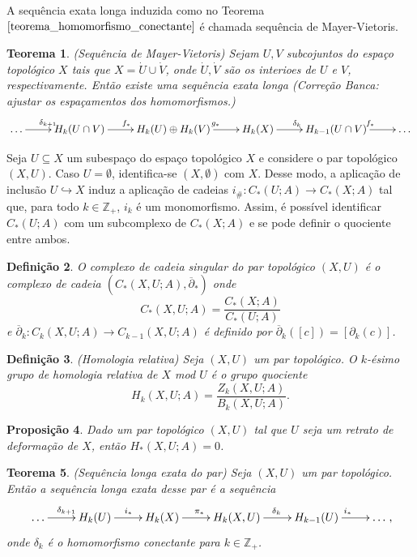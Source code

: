 \documentclass[12pt]{book}
\newtheorem{teorema}{Teorema}[section]
\newtheorem{definicao}[teorema]{Definição}
\newtheorem{proposicao}[teorema]{Proposição}
\newcommand{\bordo}[1]{\partial_{#1}}
\newcommand{\bordorel}[1]{\overline{\partial}_{#1}}
\newcommand{\cadeia}[2]{C_{#1}(#2; A)}
\newcommand{\classe}[1]{[#1]}
\newcommand{\homologia}[2]{H_{#1}(#2;A)}
\newcommand{\homologiaabrev}[2]{H_{#1}(#2)}
\newcommand{\imagembordo}[2]{B_{#1}(#2;A)}
\newcommand{\induzida}[1]{#1_{\#}}
\newcommand{\inteiros}{\mathbb{Z}}
\newcommand{\inteirospos}{\inteiros_{+}}
\newcommand{\kernelbordo}[2]{Z_{#1}(#2;A)}
\newcommand{\alerta}[1]{{\color{red}#1}}
\newcommand{\correcaobanca}[1]{\alerta{(Correção Banca: #1)}}
\begin{document}
	A sequência exata longa induzida como no Teorema $\ref{teorema_homomorfismo_conectante}$ é chamada sequência de Mayer-Vietoris.
	
	\begin{teorema}
		(Sequência de Mayer-Vietoris) Sejam $U, V$ subcojuntos do espaço topológico $X$ tais que $X = \dot{U }\cup \dot{V}$, onde $\dot{U}, \dot{V}$ são os interioes de $U$ e $V$, respectivamente. Então existe uma sequência exata longa 
			\correcaobanca{ajustar os espaçamentos dos homomorfismos.}
		\[
		\xymatrix{\dots \ar[r]^{\delta_{k+1}} & \homologiaabrev{k}{U\cap V}\ar[r]^{f_{*}} & \homologiaabrev{k}{U}\oplus \homologiaabrev{k}{V}\ar[r]^{g_{*}}& \homologiaabrev{k}{X}\ar[r]^{\delta_{k}} & \homologiaabrev{k-1}{U \cap V} \ar[r]^{f_{*}}& \dots} 
		\]
		
	\end{teorema}
	
	Seja $U \subseteq X$ um subespaço do espaço topológico $X$ e considere o par topológico $(X, U)$. Caso $U = \emptyset$, identifica-se $(X, \emptyset)$ com $X$. Desse modo, a aplicação de inclusão $U \hookrightarrow X$ induz a aplicação de cadeias $\induzida{i}: \cadeia{*}{U} \to \cadeia{*}{X}$ tal que, para todo $k \in \inteirospos$, $i_{k}$ é um monomorfismo. Assim, é possível identificar $\cadeia{*}{U}$ com um subcomplexo de $\cadeia{*}{X}$ e se pode definir o quociente entre ambos.
	
	\begin{definicao}
		O complexo de cadeia singular do par topológico $(X,U)$ é o complexo de cadeia $(\cadeia{*}{X,U},\bordorel{*} )$ onde 
		$$
		\cadeia{*}{X,U} = \frac{\cadeia{*}{X}}{\cadeia{*}{U}}
		$$
		e $\bordorel{k}: \cadeia{k}{X,U} \to \cadeia{k-1}{X,U}$ é definido por $\bordorel{k}(\classe{c}) = \classe{\bordo{k}(c)}$.
	\end{definicao}
	
	\begin{definicao}
		(Homologia relativa) Seja $(X, U)$ um par topológico. O $k$-ésimo grupo de homologia relativa de $X$ mod $U$ é o grupo quociente
		$$
		\homologia{k}{X,U} = \frac{\kernelbordo{k}{X,U}}{\imagembordo{k}{X, U}}.
		$$
	\end{definicao}
	
	\begin{proposicao}
		Dado um par topológico $(X, U)$ tal que $U$ seja um retrato de deformação de $X$, então $\homologia{*}{X,U} = 0$.
	\end{proposicao}
	
	\begin{teorema}
		(Sequência longa exata do par) Seja $(X, U)$ um par topológico. Então a sequência longa exata desse par é a sequência
		$$
		\xymatrix{\dots \ar[r]^{\delta_{k+1}} & \homologiaabrev{k}{U}\ar[r]^{i_{*}} & \homologiaabrev{k}{X}\ar[r]^{\pi_{*}}& \homologiaabrev{k}{X, U}\ar[r]^{\delta_{k}} & \homologiaabrev{k-1}{U} \ar[r]^{i_{*}}& \dots},
		$$
		onde $\delta_{k}$ é o homomorfismo conectante para $k \in \inteirospos$.
	\end{teorema}
	
\end{document}
